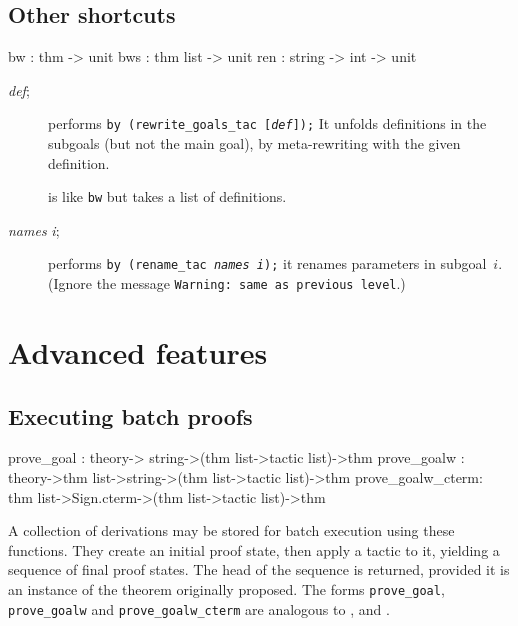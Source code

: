 \subsection{Other shortcuts}
\begin{ttbox} 
bw  : thm -> unit
bws : thm list -> unit
ren : string -> int -> unit
\end{ttbox}
\begin{description}
\item[ {\it def};] 
performs \hbox{\tt by (rewrite_goals_tac [{\it def}]);}
It unfolds definitions in the subgoals (but not the main goal), by
meta-rewriting with the given definition.

\item[] 
is like {\tt bw} but takes a list of definitions.

\item[ {\it names} {\it i};] 
performs \hbox{\tt by (rename_tac {\it names} {\it i});} it renames
parameters in subgoal~$i$.  (Ignore the message {\tt Warning:\ same as
previous level}.)
\end{description}



\section{Advanced features}
\subsection{Executing batch proofs}
\begin{ttbox}
prove_goal  :  theory->          string->(thm list->tactic list)->thm
prove_goalw :  theory->thm list->string->(thm list->tactic list)->thm
prove_goalw_cterm: thm list->Sign.cterm->(thm list->tactic list)->thm
\end{ttbox}
A collection of derivations may be stored for batch execution using these
functions.  They create an initial proof state, then apply a tactic to it,
yielding a sequence of final proof states.  The head of the sequence is
returned, provided it is an instance of the theorem originally proposed.
The forms {\tt prove_goal}, {\tt prove_goalw} and {\tt prove_goalw_cterm}
are analogous to ,  and .

